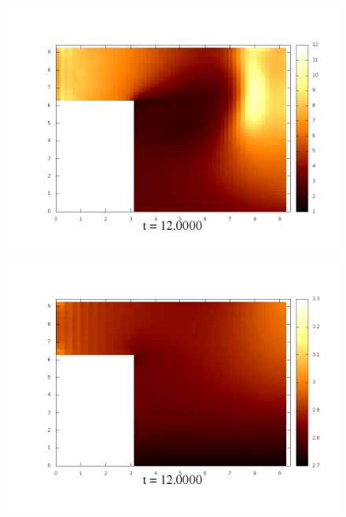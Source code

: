 \documentclass[a4paper, 12pt]{article}
\begin{document}
\begin{figure}[h]
	\begin{minipage}[h]{0.4\linewidth}
		\includegraphics[width=1\linewidth]{./img/01_1_1/G/60}
	\end{minipage}
	\hfill
	\begin{minipage}[h]{0.4\linewidth}
		\includegraphics[width=1\linewidth]{./img/01_1_01/G/60}
	\end{minipage}
\end{figure}
\end{document}
